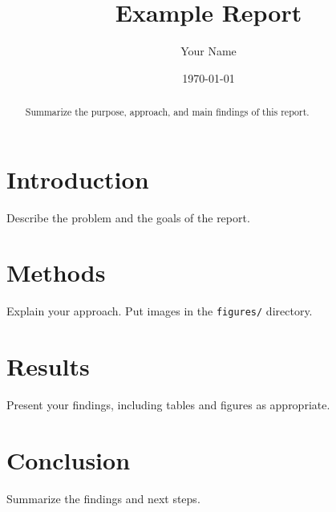 \documentclass[11pt,letterpaper]{article}
\title{Example Report}
\author{Your Name}
\date{\today}
\begin{document}
\maketitle

\begin{abstract}
Summarize the purpose, approach, and main findings of this report.
\end{abstract}

\section{Introduction}
Describe the problem and the goals of the report.

\section{Methods}
Explain your approach. Put images in the \texttt{figures/} directory.

\section{Results}
Present your findings, including tables and figures as appropriate.

\section{Conclusion}
Summarize the findings and next steps.
\end{document}
